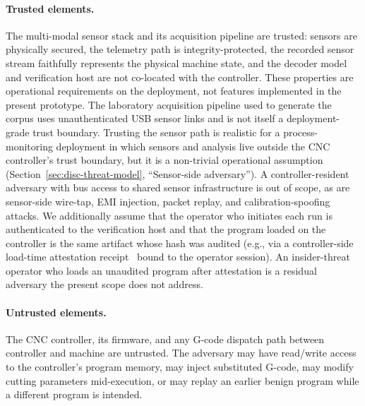 \documentclass[sensors,article,submit,moreauthors,pdftex]{Definitions/mdpi}
\begin{document}
\paragraph{Trusted elements.} The multi-modal sensor stack and its acquisition pipeline are trusted: sensors are physically secured, the telemetry path is integrity-protected, the recorded sensor stream faithfully represents the physical machine state, and the decoder model and verification host are not co-located with the controller. These properties are operational requirements on the deployment, not features implemented in the present prototype. The laboratory acquisition pipeline used to generate the corpus uses unauthenticated USB sensor links and is not itself a deployment-grade trust boundary. Trusting the sensor path is realistic for a process-monitoring deployment in which sensors and analysis live outside the CNC controller's trust boundary, but it is a non-trivial operational assumption (Section~\ref{sec:disc-threat-model}, ``Sensor-side adversary''). A controller-resident adversary with bus access to shared sensor infrastructure is out of scope, as are sensor-side wire-tap, EMI injection, packet replay, and calibration-spoofing attacks. We additionally assume that the operator who initiates each run is authenticated to the verification host and that the program loaded on the controller is the same artifact whose hash was audited (e.g., via a controller-side load-time attestation receipt~\cite{zonouz2014plc} bound to the operator session). An insider-threat operator who loads an unaudited program after attestation is a residual adversary the present scope does not address.

\paragraph{Untrusted elements.} The CNC controller, its firmware, and any G-code dispatch path between controller and machine are untrusted. The adversary may have read/write access to the controller's program memory, may inject substituted G-code, may modify cutting parameters mid-execution, or may replay an earlier benign program while a different program is intended.
\end{document}

